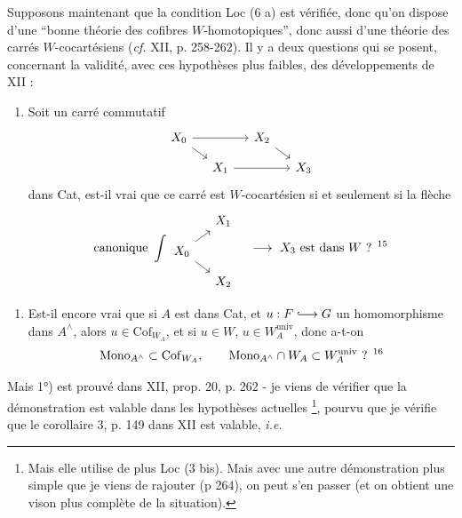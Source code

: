 \documentclass[11pt]{article}
\newcommand{\msp}[1]{\marginpar{\footnotesize [#1]}}
\newcommand{\Cof}{\mathrm{Cof}}
\newcommand{\Mono}{\mathrm{Mono}}
\newcommand{\univ}{\mathrm{univ}}
\begin{document}
Supposons maintenant que la condition Loc (6 a) est vérifiée, donc qu'on dispose d'une “bonne théorie des cofibres $W$-homotopiques”, donc aussi d'une théorie des carrés $W$-cocartésiens (\textit{cf.} XII, p. 258-262). Il y a deux questions qui se posent, concernant la validité, avec ces hypothèses plus faibles, des développements de XII :
\begin{enumerate}
\item[1°)] Soit un carré commutatif
\[
\begin{tikzcd}[ampersand replacement=\&, row sep=small, column sep=small]
X_0 \arrow[rr] \arrow[dr] \& \& X_2 \arrow[dr] \& \\
\& X_1 \arrow[rr] \& \& X_3
\end{tikzcd}
\]
dans Cat, est-il vrai que ce carré est $W$-cocartésien si et seulement si la flèche
\[
\text{canonique}\ \displaystyle\int
\begin{tikzcd}[ampersand replacement=\&, row sep=small, column sep=small]
\& X_1 \\
X_0 \arrow[ur] \arrow[dr] \& \\
\& X_2
\end{tikzcd}
\quad \longrightarrow \ X_3 \text{ est dans } W \text{ ? }\text{\footnotemark[15]}
\]
\end{enumerate}
\msp{page 24}
\begin{enumerate}
\item[2°)] Est-il encore vrai que si $A$ est dans Cat, et $u : F \lhook\joinrel\longrightarrow G$ un homomorphisme dans $A^{\wedge}$, alors $u \in \Cof_{W_A}$, et si $u \in W$, $u \in W_A^{\univ}$, donc a-t-on
\[
\Mono_{A^{\wedge}} \subset \Cof_{W_A}, \qquad \Mono_{A^{\wedge}} \cap W_A \subset W_A^{\univ} \text{ ? }\text{\footnotemark[16]}
\]
\end{enumerate}
Mais 1°) est prouvé dans XII, prop. 20, p. 262 - je viens de vérifier que la démonstration est valable dans les hypothèses actuelles \footnote[17]{Mais elle utilise de plus Loc (3 bis). Mais avec une autre démonstration plus simple que je viens de rajouter (p 264), on peut s'en passer (et on obtient une vison plus complète de la situation).}, pourvu que je vérifie que le corollaire 3, p. 149 dans XII est valable, \textit{i.e.} %
\end{document}
